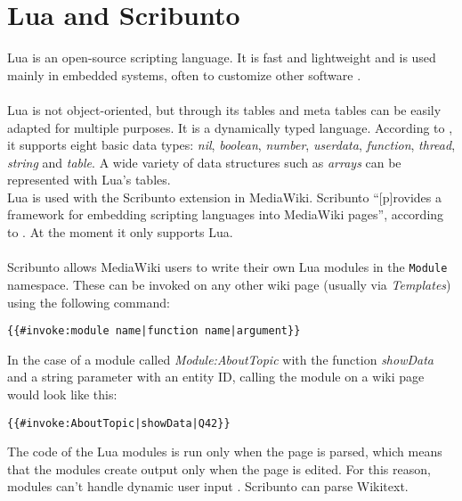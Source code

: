 \section{Lua and Scribunto}

Lua is an open-source scripting language. It is fast and lightweight and is used mainly in embedded systems, often to customize other software \citep{lua:01}. \\
\\
Lua is not object-oriented, but through its tables and meta tables can be easily adapted for multiple purposes. It is a dynamically typed language. According to \citet[9]{luabook:01}, it supports eight basic data types: \textit{nil}, \textit{boolean}, \textit{number}, \textit{userdata}, \textit{function}, \textit{thread}, \textit{string} and \textit{table}. A wide variety of data structures such as \textit{arrays} can be represented with Lua's tables. \\
Lua is used with the Scribunto extension in MediaWiki. Scribunto ``[p]rovides a framework for embedding scripting languages into MediaWiki pages'', according to \citet{wiki:19}. At the moment it only supports Lua. \\
\\
Scribunto allows MediaWiki users to write their own Lua modules in the \texttt{\justify Module} namespace. These can be invoked on any other wiki page (usually via \textit{Templates}) using the following command:
\begin{lstlisting}[frame=single] 
{{#invoke:module name|function name|argument}}
\end{lstlisting}

In the case of a module called \textit{Module:AboutTopic} with the function \textit{showData} and a string parameter with an entity ID, calling the module on a wiki page would look like this:
\begin{lstlisting}[frame=single] 
{{#invoke:AboutTopic|showData|Q42}}
\end{lstlisting}

The code of the Lua modules is run only when the page is parsed, which means that the modules create output only when the page is edited. For this reason, modules can't handle dynamic user input \citep{wiki:20}. Scribunto can parse Wikitext.
